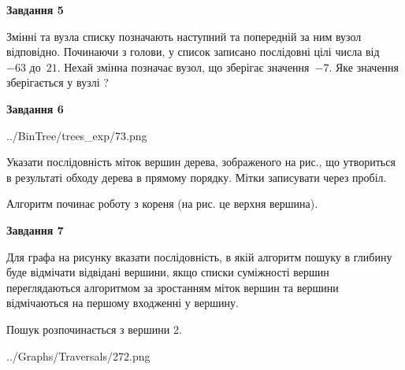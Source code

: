 \documentclass[12pt, ukrainian]{article}
\begin{document}
{\begin {large}
{\begin {center}\textbf{Завдання 5}\end {center}}\par
Змінні  та  вузла списку позначають наступний та попередній за ним вузол відповідно. Починаючи з голови, у список записано послідовні цілі числа від~$-63$ до~$21$. Нехай змінна  позначає вузол, що зберігає значення~$-7$.
Яке значення зберігається у вузлі  ?\par
\newpage

{\begin {center}\textbf{Завдання 6}\end {center}}\par

\begin{center}
	{../BinTree/trees_exp/73.png}
\end{center}
Указати послідовність міток вершин дерева, зображеного на рис., що утвориться в результаті обходу дерева в прямому порядку. Мітки записувати через пробіл.\par Алгоритм починає роботу з кореня (на рис. це верхня вершина).\par
\newpage

{\begin {center}\textbf{Завдання 7}\end {center}}\par
Для графа на рисунку вказати послідовність, в якій алгоритм пошуку в глибину буде відмічати відвідані вершини, якщо списки суміжності вершин переглядаються алгоритмом за зростанням міток вершин та вершини відмічаються на першому вход\-женні у вершину.\par
Пошук розпочинається з вершини 2.\par

\begin{center}
	{../Graphs/Traversals/272.png}
\end{center}\par
\newpage


\end{large}}
\end{document}
